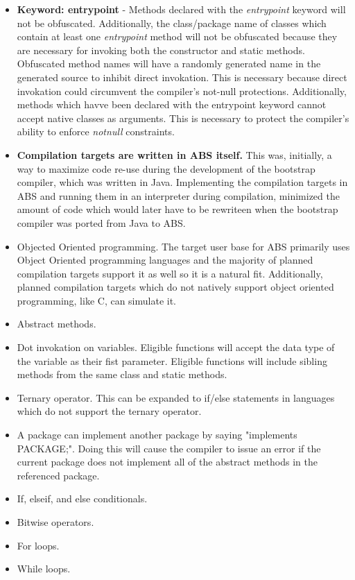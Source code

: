 \documentclass[hidelinks]{article}
\begin{document}
\begin{itemize}
\item \textbf{Keyword: entrypoint} - Methods declared with the \textit{entrypoint} keyword will not be obfuscated. Additionally, the class/package name of classes which contain at least one \textit{entrypoint} method will not be obfuscated because they are necessary for invoking both the constructor and static methods. Obfuscated method names will have a randomly generated name in the generated source to inhibit direct invokation. This is necessary because direct invokation could circumvent the compiler's not-null protections. Additionally, methods which havve been declared with the entrypoint keyword cannot accept native classes as arguments. This is necessary to protect the compiler's ability to enforce \textit{notnull} constraints.
\item \textbf{Compilation targets are written in ABS itself.} This was, initially, a way to maximize code re-use during the development of the bootstrap compiler, which was written in Java. Implementing the compilation targets in ABS and running them in an interpreter during compilation, minimized the amount of code which would later have to be rewriteen when the bootstrap compiler was ported from Java to ABS.
\item Objected Oriented programming. The target user base for ABS primarily uses Object Oriented programming languages and the majority of planned compilation targets support it as well so it is a natural fit. Additionally, planned compilation targets which do not natively support object oriented programming, like C, can simulate it.
\item Abstract methods.
\item Dot invokation on variables. Eligible functions will accept the data type of the variable as their fist parameter. Eligible functions will include sibling methods from the same class and static methods.
\item Ternary operator. This can be expanded to if/else statements in languages which do not support the ternary operator.
\item A package can implement another package by saying "implements PACKAGE;". Doing this will cause the compiler to issue an error if the current package does not implement all of the abstract methods in the referenced package.
\item If, elseif, and else conditionals.
\item Bitwise operators.
\item For loops.
\item While loops.

\end{itemize}
\end{document}
